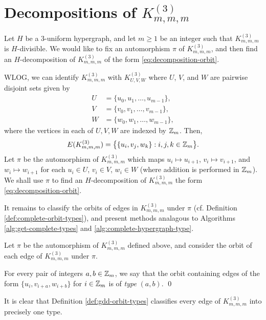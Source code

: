 \section{Decompositions of $K_{m,m,m}^{(3)}$}
\label{sec:methods/gdd}

Let $H$ be a $3$-uniform hypergraph, and let $m \geq 1$ be an integer such that $K_{m,m,m}^{(3)}$ is $H$-divisible. We would like to fix an automorphism $\pi$ of $K_{m,m,m}^{(3)}$, and then find an $H$-decomposition of $K_{m,m,m}^{(3)}$ of the form \eqref{eq:decomposition-orbit}.

WLOG, we can identify $K_{m,m,m}^{(3)}$ with $K_{U,V,W}^{(3)}$ where $U$, $V$, and $W$ are pairwise disjoint sets given by
\begin{align}
    U &= \{ u_0, u_1, \ldots, u_{m-1} \}, \nonumber \\
    V &= \{ v_0, v_1, \ldots, v_{m-1} \}, \nonumber \\
    W &= \{ w_0, w_1, \ldots, w_{m-1} \}, \nonumber
\end{align}
where the vertices in each of $U, V, W$ are indexed by $\mathbb{Z}_m$. Then,
\begin{equation} \label{eq:gdd-edges}
    E(K_{m,m,m}^{(3)}) = \big\{ \{u_i, v_j, w_k\} : i,j,k \in \mathbb{Z}_m \big\}.
\end{equation}
Let $\pi$ be the automorphism of $K_{m,m,m}^{(3)}$ which maps $u_i \mapsto u_{i+1}$, $v_i \mapsto v_{i+1}$, and $w_{i} \mapsto w_{i+1}$ for each $u_i \in U$, $v_i \in V$, $w_i \in W$ (where addition is performed in $\mathbb{Z}_m$).
We shall use $\pi$ to find an $H$-decomposition of $K_{m,m,m}^{(3)}$ the form \eqref{eq:decomposition-orbit}.

It remains to classify the orbits of edges in $K_{m,m,m}^{(3)}$ under $\pi$ (cf. Definition \ref{def:complete-orbit-types}), and present methods analagous to Algorithms \ref{alg:get-complete-types} and \ref{alg:complete-hypergraph-type}.

\begin{definition} \label{def:gdd-orbit-types}
Let $\pi$ be the automorphism of $K_{m,m,m}^{(3)}$ defined above, and consider the orbit of each edge of $K_{m,m,m}^{(3)}$ under $\pi$.

For every pair of integers $a, b \in \mathbb{Z}_m$, we say that the orbit containing edges of the form $\{u_i, v_{i+a}, w_{i+b}\}$ for $i \in \mathbb{Z}_m$ is of {\em type} $(a, b)$.
\qed
\end{definition}

It is clear that Definition \ref{def:gdd-orbit-types} classifies every edge of $K_{m,m,m}^{(3)}$ into precisely one type.

